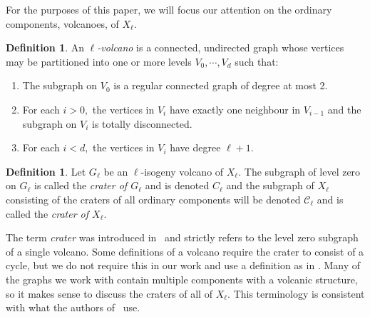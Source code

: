\documentclass[11pt,a4paper]{amsart}
\theoremstyle{plain}
\theoremstyle{definition}
\newtheorem{defn}[thm]{Definition}
\theoremstyle{remark}
\begin{document}
For the purposes of this paper, we will focus our attention on the ordinary components, volcanoes, of $X_{\ell}.$
\begin{defn}
  An \emph{$\ell$-volcano} is a connected, undirected graph whose vertices may be partitioned into one or more levels $V_0, \cdots, V_d$  such that:
  \begin{enumerate}[label=(\roman*)]
  \item The subgraph on $V_0$ is a regular connected graph of degree at most 2.
  \item For each $i > 0,$ the vertices in $V_i$ have exactly one neighbour in $V_{i-1}$ and the subgraph on $V_i$ is totally disconnected.
  \item For each $i < d,$ the vertices in $V_i$ have degree $\ell + 1.$
  \end{enumerate}
\end{defn}
\begin{defn}
Let $G_{\ell}$ be an $\ell$-isogeny volcano of $X_{\ell}.$ The subgraph of level zero on $G_{\ell}$ is called the \emph{crater of $G_{\ell}$} and is denoted $C_\ell$ and the subgraph of $X_{\ell}$ consisting of the craters of all ordinary components will be denoted $\mathcal{C}_{\ell}$ and is called the \emph{crater of $X_{\ell}$}.
\end{defn}
The term \emph{crater} was introduced in~\cite{Fouquet-Morain} and strictly refers to the level zero subgraph of a single volcano. Some definitions of a volcano \cite{distort-volcano} require the crater to consist of a cycle, but we do not require this in our work and use a definition as in \cite{Sutherland-volcanoes}. Many of the graphs we work with contain multiple components with a volcanic structure, so it makes sense to discuss the craters of all of $X_{\ell}.$ This terminology is consistent with what the authors of~\cite{Lei-Muller} use.
\end{document}
